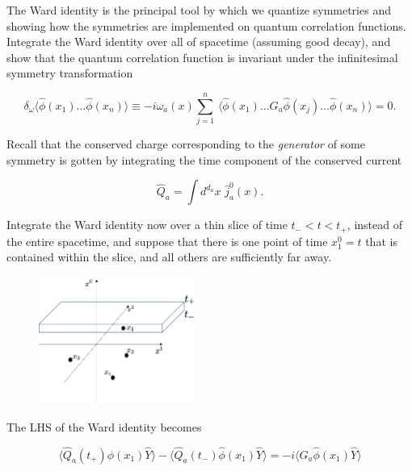 \noindent The Ward identity is the principal tool by which we quantize symmetries and showing how the symmetries are implemented on quantum correlation functions. \\

\noindent Integrate the Ward identity over all of spacetime (assuming good decay), and show that the quantum correlation function is invariant under the infinitesimal symmetry transformation

\begin{equation}
\delta_\omega \langle \hat{\phi} (x_1) \dots \hat{\phi} (x_n) \rangle \equiv -i \omega_a (x) \sum_{j=1}^n \, \langle\hat{\phi} (x_1) \dots G_a \hat{\phi} (x_j) \dots \hat{\phi} (x_n) \rangle = 0.
\end{equation}

\noindent Recall that the conserved charge corresponding to the \textit{generator} of some symmetry is gotten by integrating the time component of the conserved current

\begin{equation}
\hat{Q}_a = \int d^{d_a} x \,\, \hat{j}_a^0 (x).
\end{equation}

\noindent Integrate the Ward identity now over a thin slice of time $t_- < t < t_+$, instead of the entire spacetime, and suppose that there is one point of time $x_1^0 = t$ that is contained within the slice, and all others are sufficiently far away.

\begin{figure}[H]
	\centering
	\includegraphics[width=2in]{images/ward_timeslice.png} 
\end{figure} 

\noindent The LHS of the Ward identity becomes 

\begin{equation}
\langle \hat{Q}_a (t_+) \hat{\phi} (x_1) \hat{Y} \rangle - \langle \hat{Q}_a (t_-) \hat{\phi} (x_1) \hat{Y} \rangle = -i \langle G_a \hat{\phi} (x_1) \hat{Y} \rangle
\end{equation}

